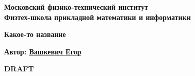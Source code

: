 
\begin{titlepage}
  \clearpage\thispagestyle{empty}
  \centering

  \textbf{Московский физико-технический институт \\ Физтех-школа прикладной математики и информатики}

  \vspace{10ex}

  {\textbf{Какое-то название}}

  \vspace{10ex}

  {\textbf{Автор: \href{https://vk.com/id251150059}{Вашкевич Егор}}}

  \vspace{10ex}





  \ifdraft    %
    \begin{tcolorbox}
      \centering
      \bfseries\Huge{DRAFT}
    \end{tcolorbox}
  \else
  \fi

  \vfill

  \displayAutoLastUpdatedDate

  \pagebreak
\end{titlepage}
